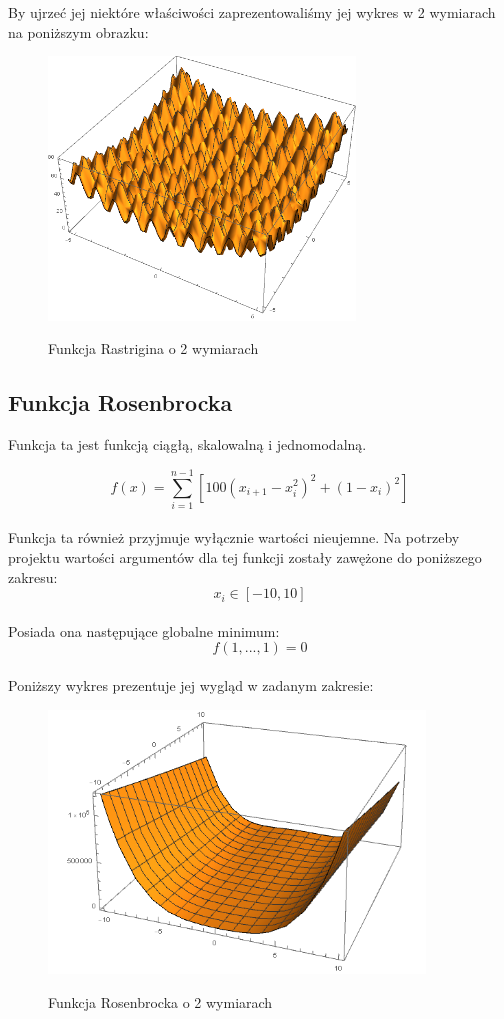 \documentclass[twoside]{projektInzynierskiMS1}
\newcommand{\si}{ś}
\begin{document}
By ujrzeć jej niektóre wła\si ciwo\si ci zaprezentowali\si my jej wykres w 2 wymiarach na poniższym obrazku:\\
\begin{figure}[H]
	\begin{center}
		\includegraphics[height=7cm]{rastriginFunction1.png}\\
	\end{center}
	\caption{Funkcja Rastrigina o 2 wymiarach}
\end{figure}



	\subsection{Funkcja Rosenbrocka}
Funkcja ta jest funkcją ciągłą, skalowalną i jednomodalną.

\[f(x) = \sum_{i=1}^{n-1} [100\left(x_{i+1} - x_i^2\right)^2 + \left(1- x_i\right)^2 ]\] \\


Funkcja ta również przyjmuje wyłącznie warto\si ci nieujemne. Na potrzeby projektu warto\si ci argumentów dla tej funkcji zostały zawężone do poniższego zakresu:
\[x_i \in [-10, 10] \] \\

Posiada ona następujące globalne minimum:
\[ f(1,...,1) = 0 \] \\

Poniższy wykres prezentuje jej wygląd w zadanym zakresie:\\
\begin{figure}[H]
	\begin{center}
		\includegraphics[height=7cm]{rosenbrockFunction1.png}\\
	\end{center}
	\caption{Funkcja Rosenbrocka o 2 wymiarach}
\end{figure}
\end{document}
